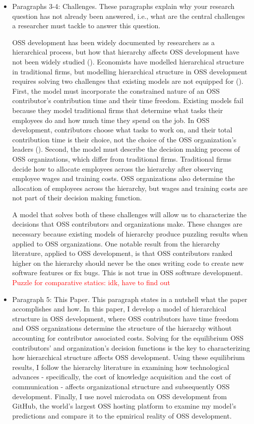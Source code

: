 \documentclass[12pt,notitlepage]{article}
\begin{document}
\begin{itemize}
\item Paragraphs 3-4: Challenges. These paragraphs explain why your research question has not already been answered, i.e., what are the central challenges a researcher must tackle to answer this question.

\qquad OSS development has been widely documented by researchers as a hierarchical process, but how that hierarchy affects OSS development have not been widely studied (\cite{crowston_hierarchy_2006}). Economists have modelled hierarchical structure in traditional firms, but modelling hierarchical structure in OSS development requires solving two challenges that existing models are not equipped for (\cite{garicano_hierarchies_2000}). First, the model must incorporate the constrained nature of an OSS contributor's contribution time and their time freedom. Existing models fail because they model traditional firms that determine what tasks their employees do and how much time they spend on the job. In OSS development, contributors choose what tasks to work on, and their total contribution time is their choice, not the choice of the OSS organization's leaders (\cite{lerner_simple_2002}). Second, the model must describe the decision making process of OSS organizations, which differ from traditional firms. Traditional firms decide how to allocate employees across the hierarchy after observing employee wages and training costs. OSS organizations also determine the allocation of employees across the hierarchy, but wages and training costs are not part of their decision making function. 


A model that solves both of these challenges will allow us to characterize the decisions that OSS contributors and organizations make. These changes are necessary because existing models of hierarchy produce puzzling results when applied to OSS organizations. One notable result from the hierarchy literature, applied to OSS development, is that OSS contributors ranked higher on the hierarchy should never be the ones writing code to create new software features or fix bugs. This is not true in OSS software development. \textcolor{red}{Puzzle for comparative statics: idk, have to find out}


\item Paragraph 5: This Paper. This paragraph states in a nutshell what the paper accomplishes and how. 
In this paper, I develop a model of hierarchical structure in OSS development, where OSS contributors have time freedom and OSS organizations determine the structure of the hierarchy without accounting for contributor associated costs. Solving for the equilibrium OSS contributors' and organization's decision functions is the key to characterizing how hierarchical structure affects OSS development. Using these equilibrium results, I follow the hierarchy literature in examining how technological advances - specifically, the cost of knowledge acquisition and the cost of communication - affects organizational structure and subsequently OSS development. Finally, I use novel microdata on OSS development from GitHub, the world's largest OSS hosting platform to examine my model's predictions and compare it to the epmirical reality of OSS development. 


\end{itemize}
\end{document}
